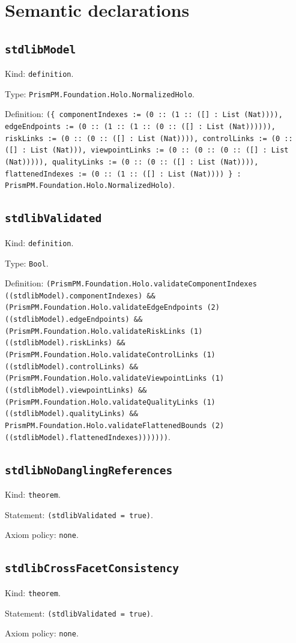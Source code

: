 \documentclass[11pt]{article}
\begin{document}
\section*{Semantic declarations}
\subsection*{\texttt{stdlibModel}}
\noindent Kind: \texttt{definition}.\par
\noindent Type: \texttt{PrismPM.Foundation.Holo.NormalizedHolo}.\par
\noindent Definition: \texttt{(\{ componentIndexes := (0 :: (1 :: ([] : List (Nat)))), edgeEndpoints := (0 :: (1 :: (1 :: (0 :: ([] : List (Nat)))))), riskLinks := (0 :: (0 :: ([] : List (Nat)))), controlLinks := (0 :: ([] : List (Nat))), viewpointLinks := (0 :: (0 :: (0 :: ([] : List (Nat))))), qualityLinks := (0 :: (0 :: ([] : List (Nat)))), flattenedIndexes := (0 :: (1 :: ([] : List (Nat)))) \} : PrismPM.Foundation.Holo.NormalizedHolo)}.\par
\subsection*{\texttt{stdlibValidated}}
\noindent Kind: \texttt{definition}.\par
\noindent Type: \texttt{Bool}.\par
\noindent Definition: \texttt{(PrismPM.Foundation.Holo.validateComponentIndexes ((stdlibModel).componentIndexes) \&\& (PrismPM.Foundation.Holo.validateEdgeEndpoints (2) ((stdlibModel).edgeEndpoints) \&\& (PrismPM.Foundation.Holo.validateRiskLinks (1) ((stdlibModel).riskLinks) \&\& (PrismPM.Foundation.Holo.validateControlLinks (1) ((stdlibModel).controlLinks) \&\& (PrismPM.Foundation.Holo.validateViewpointLinks (1) ((stdlibModel).viewpointLinks) \&\& (PrismPM.Foundation.Holo.validateQualityLinks (1) ((stdlibModel).qualityLinks) \&\& PrismPM.Foundation.Holo.validateFlattenedBounds (2) ((stdlibModel).flattenedIndexes)))))))}.\par
\subsection*{\texttt{stdlibNoDanglingReferences}}
\noindent Kind: \texttt{theorem}.\par
\noindent Statement: \texttt{(stdlibValidated = true)}.\par
\noindent Axiom policy: \texttt{none}.\par
\subsection*{\texttt{stdlibCrossFacetConsistency}}
\noindent Kind: \texttt{theorem}.\par
\noindent Statement: \texttt{(stdlibValidated = true)}.\par
\noindent Axiom policy: \texttt{none}.\par
\end{document}

